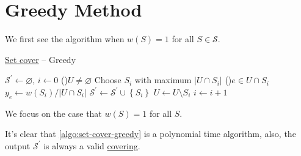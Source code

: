 \section{Greedy Method}
We first see the algorithm when \(w(S) = 1\) for all \(S\in \mathcal{S} \).

\begin{algorithm}[H]\label{algo:set-cover-greedy}
	\DontPrintSemicolon
	\caption{\hyperref[prb:set-cover]{Set cover} -- Greedy}
	\BlankLine

	\(\mathcal{S} ^\prime \gets \varnothing \), \(i\gets 0\)\;
	\While(){\(U \neq \varnothing \)}{
		Choose \(S_i\) with maximum \(\left\vert U \cap S_i \right\vert\)
		\For(){\(e\in U \cap S_i\) }{
			\(y_e \gets w(S_{i}) / \left\vert U \cap S_i \right\vert \)
		}
		\(\mathcal{S} ^\prime \gets \mathcal{S} ^\prime \cup \left\{ S_i \right\} \)\;
		\(U\gets U\setminus S_i\)\;\label{line5:algo:set-cover-greedy}
		\(i\gets i+1\)\;
	}
	\;
\end{algorithm}

We focus on the case that \(w(S) = 1\) for all \(S\).

\begin{remark}
	It's clear that \autoref{algo:set-cover-greedy} is a polynomial time algorithm, also, the output \(\mathcal{S} ^\prime \) is always a valid \hyperref[def:covering]{covering}.
\end{remark}

